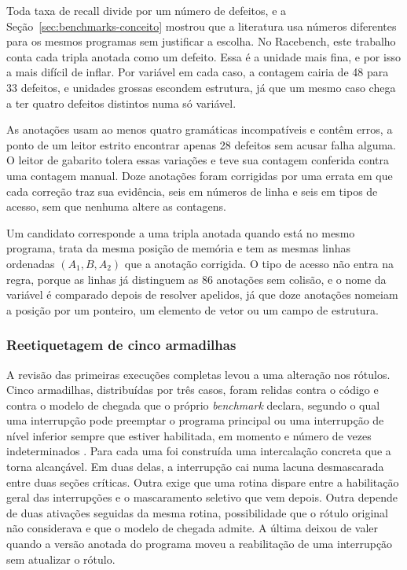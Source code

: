 Toda taxa de recall divide por um número de defeitos, e a
Seção~\ref{sec:benchmarks-conceito} mostrou que a literatura usa números
diferentes para os mesmos programas sem justificar a escolha. No Racebench,
este trabalho conta cada tripla anotada como um defeito. Essa é a unidade mais
fina, e por isso a mais difícil de inflar. Por variável em cada caso, a
contagem cairia de 48 para 33 defeitos, e unidades grossas escondem estrutura,
já que um mesmo caso chega a ter quatro defeitos distintos numa só variável.

As anotações usam ao menos quatro gramáticas incompatíveis e contêm erros, a
ponto de um leitor estrito encontrar apenas 28 defeitos sem acusar falha
alguma. O leitor de gabarito tolera essas variações e teve sua contagem
conferida contra uma contagem manual. Doze anotações foram corrigidas por uma
errata em que cada correção traz sua evidência, seis em números de linha e seis
em tipos de acesso, sem que nenhuma altere as contagens.

Um candidato corresponde a uma tripla anotada quando está no mesmo programa,
trata da mesma posição de memória e tem as mesmas linhas ordenadas
$(A_1, B, A_2)$ que a anotação corrigida. O tipo de acesso não entra na regra,
porque as linhas já distinguem as 86 anotações sem colisão, e o nome da
variável é comparado depois de resolver apelidos, já que doze anotações nomeiam
a posição por um ponteiro, um elemento de vetor ou um campo de estrutura.

\subsubsection{Reetiquetagem de cinco armadilhas}
\label{sec:reetiquetagem}

A revisão das primeiras execuções completas levou a uma alteração nos rótulos.
Cinco armadilhas, distribuídas por três casos, foram relidas contra o código e
contra o modelo de chegada que o próprio \textit{benchmark} declara, segundo o
qual uma interrupção pode preemptar o programa principal ou uma interrupção de
nível inferior sempre que estiver habilitada, em momento e número de vezes
indeterminados \cite{racebench}. Para cada uma foi construída uma intercalação
concreta que a torna alcançável. Em duas delas, a interrupção cai numa lacuna
desmascarada entre duas seções críticas. Outra exige que uma rotina dispare
entre a habilitação geral das interrupções e o mascaramento seletivo que vem
depois. Outra depende de duas ativações seguidas da mesma rotina,
possibilidade que o rótulo original não considerava e que o modelo de chegada
admite. A última deixou de valer quando a versão anotada do programa moveu a
reabilitação de uma interrupção sem atualizar o rótulo.


